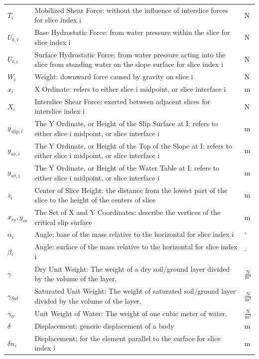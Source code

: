 \documentclass[12pt]{article}
\begin{document}
\begin{longtable*}{l l l}
$T_{i}$ & Mobilized Shear Force: without the influence of interslice forces for slice index i & N
\\
$U_{b,i}$ & Base Hydrostatic Force: from water pressure within the slice for slice index i & N
\\
$U_{t,i}$ & Surface Hydrostatic Force: from water pressure acting into the slice from standing water on the slope surface for slice index i & N
\\
$W_{i}$ & Weight: downward force caused by gravity on slice i & N
\\
$x_{i}$ & X Ordinate: refers to either slice i midpoint, or slice interface i & m
\\
$X_{i}$ & Interslice Shear Force: exerted between adjacent slices for interslice index i & N
\\
$y_{slip,i}$ & The Y Ordinate, or Height of the Slip Surface at I: refers to either slice i midpoint, or slice interface i & m
\\
$y_{us,i}$ & The Y Ordinate, or Height of the Top of the Slope at I: refers to either slice i midpoint, or slice interface i & m
\\
$y_{wt,i}$ & The Y Ordinate, or Height of the Water Table at I: refers to either slice i midpoint, or slice interface i & m
\\
$z_{i}$ & Center of Slice Height: the distance from the lowest part of the slice to the height of the centers of slice & m
\\
${x_{cs},y_{cs}}$ & The Set of X and Y Coordinates: describe the vertices of the critical slip surface & m
\\
$\alpha{}_{i}$ & Angle: base of the mass relative to the horizontal for slice index i & ${}^{\circ}$
\\
$\beta{}_{i}$ & Angle: surface of the mass relative to the horizontal for slice index i & ${}^{\circ}$
\\
$\gamma{}$ & Dry Unit Weight: The weight of a dry soil/ground layer divided by the volume of the layer. & $\frac{\text{N}}{\text{m}^{3}}$
\\
$\gamma{}_{Sat}$ & Saturated Unit Weight: The weight of saturated soil/ground layer divided by the volume of the layer. & $\frac{\text{N}}{\text{m}^{3}}$
\\
$\gamma{}_{w}$ & Unit Weight of Water: The weight of one cubic meter of water. & $\frac{\text{N}}{\text{m}^{3}}$
\\
$\delta{}$ & Displacement: generic displacement of a body & m
\\
$\delta{}n_{i}$ & Displacement: for the element parallel to the surface for slice index i & m

\end{longtable*}
\end{document}
